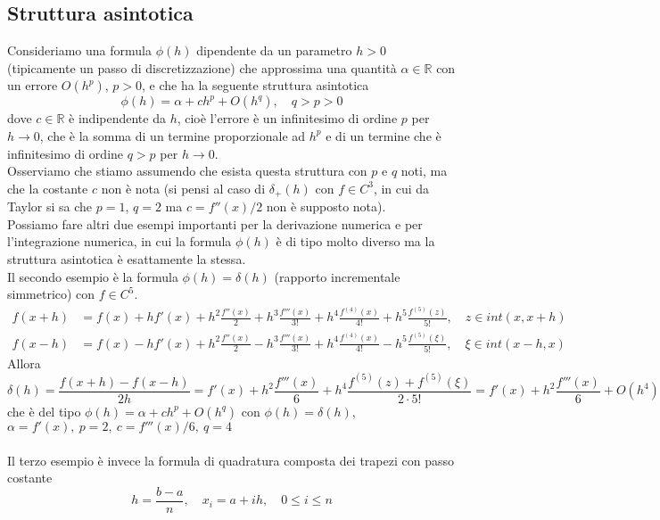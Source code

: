 \subsection{Struttura asintotica}
Consideriamo una formula $\phi (h)$ dipendente da un parametro $h>0$ (tipicamente un passo di discretizzazione) che approssima una quantità $\alpha \in \mathbb{R}$ con un errore $O(h^p)$, $p>0$, e che ha la seguente struttura asintotica
\[
\phi (h) = \alpha + ch^p + O(h^q), \quad q>p>0
\]
dove $c \in \mathbb{R}$ è indipendente da $h$, cioè l'errore è un infinitesimo di ordine $p$ per $h \to 0$,
che è la somma di un termine proporzionale ad $h^p$ e di un termine che è infinitesimo di ordine $q>p$ per $h \to 0$.\\
Osserviamo che stiamo assumendo che esista questa struttura con $p$ e $q$ noti, ma che la costante $c$ non è nota (si pensi al caso di $\delta_+ (h)$ con $f \in C^3$, in cui da Taylor si sa che $p=1$, $q=2$ ma $c = f''(x)/2$ non è supposto nota).\\
Possiamo fare altri due esempi
importanti per la derivazione numerica e per l'integrazione numerica, in cui la formula $\phi (h)$ è di tipo molto diverso ma la struttura asintotica è esattamente la stessa.\\
Il secondo esempio è la formula $\phi (h) = \delta (h)$ (rapporto incrementale simmetrico) con $f \in C^5$.\\
\[
\begin{split}
f(x+h) & = f(x) + hf'(x) + h^2 \frac{f''(x)}{2} + h^3 \frac{f'''(x)}{3!} + h^4 \frac{f^{(4)}(x)}{4!} + h^5 \frac{f^{(5)} (z)}{5!}, \quad z \in int(x, x+h) \\
f(x-h) & = f(x) - hf'(x) + h^2 \frac{f''(x)}{2} - h^3 \frac{f'''(x)}{3!} + h^4 \frac{f^{(4)} (x)}{4!} - h^5 \frac{f^{(5)} (\xi)}{5!}, \quad \xi \in int(x-h, x)
\end{split}
\]
Allora
\[
\delta (h) = \frac{f(x+h) - f(x-h)}{2h} = f'(x) + h^2 \frac{f'''(x)}{6} + h^4 \frac{f^{(5)} (z) + f^{(5)} (\xi)}{2 \cdot 5!} = f'(x) + h^2 \frac{f'''(x)}{6} + O(h^4)
\]
che è del tipo $\phi (h) = \alpha + ch^p + O(h^q)$ con $\phi (h) = \delta (h)$, $\alpha = f'(x), \  p=2, \ c=f'''(x)/6, \ q=4$\\\\
Il terzo esempio è invece la formula di quadratura composta dei trapezi con passo costante
\[
h = \frac{b-a}{n}, \quad x_i = a + ih, \quad 0 \le i \le n
\]
